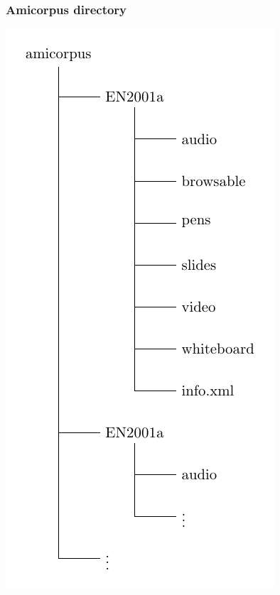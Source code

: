 \begin{frame}
    \frametitle{Amicorpus directory}
    \begin{center}
      \includegraphics[height=0.6\textheight]{graphics/tree_amicorpus}
    \end{center}
\end{frame}


